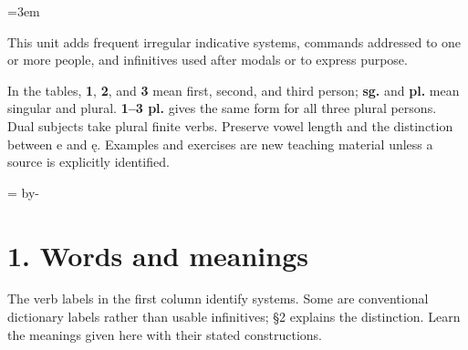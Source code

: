 \BookRecto
\begingroup
\renewcommand{\runningtitle}{Unit 6. Irregular verbs}
\emergencystretch=3em
\newcommand{\itempara}[2]{\par\addvspace{3pt}\noindent\hangindent=1.8em\hangafter=1\makebox[1.8em][l]{#1.}#2\par}
\newcommand{\reserve}[1]{\par\penalty-100\begingroup\dimen0=\pagegoal\advance\dimen0 by-\pagetotal\ifdim\dimen0<#1\newpage\fi\endgroup}

\raggedright
{}

This unit adds frequent irregular indicative systems, commands addressed to one or more people, and infinitives used after modals or to express purpose.

In the tables, \textbf{1}, \textbf{2}, and \textbf{3} mean first, second, and third person; \textbf{sg.} and \textbf{pl.} mean singular and plural. \textbf{1–3 pl.} gives the same form for all three plural persons. Dual subjects take plural finite verbs. Preserve vowel length and the distinction between e and ę. Examples and exercises are new teaching material unless a source is explicitly identified.

\reserve{7\baselineskip}
\section*{1. Words and meanings}

The verb labels in the first column identify systems. Some are conventional dictionary labels rather than usable infinitives; §2 explains the distinction. Learn the meanings given here with their stated constructions.

